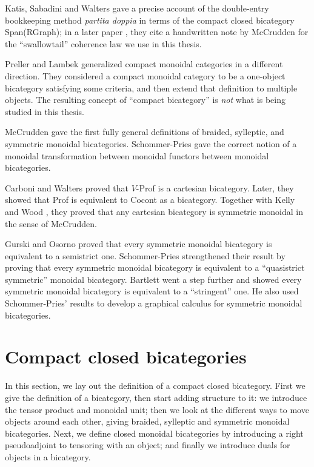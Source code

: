 \documentclass[12pt,twoside,openright]{report}
\begin{document}
Katis, Sabadini and Walters \cite{KSW98} gave a precise account of the double-entry bookkeeping method {\em partita doppia} in terms of the compact closed bicategory Span(RGraph); in a later paper \cite{KW99}, they cite a handwritten note by McCrudden for the ``swallowtail'' coherence law we use in this thesis.

Preller and Lambek \cite{PL07} generalized compact monoidal categories in a different direction.  They considered a compact monoidal category to be a one-object bicategory satisfying some criteria, and then extend that definition to multiple objects.  The resulting concept of ``compact bicategory'' is {\em not} what is being studied in this thesis.

McCrudden \cite{McCrudden} gave the first fully general definitions of braided, sylleptic, and symmetric monoidal bicategories.  Schommer-Pries \cite{SPT} gave the correct notion of a monoidal transformation between monoidal functors between monoidal bicategories.

Carboni and Walters \cite{CW87} proved that $V$-Prof is a cartesian bicategory.  Later, they showed \cite{CW04} that Prof is equivalent to Cocont as a bicategory.  Together with Kelly and Wood \cite{CKWW08}, they proved that any cartesian bicategory is symmetric monoidal in the sense of McCrudden.

Gurski and Osorno \cite{GO} proved that every symmetric monoidal bicategory is equivalent to a semistrict one. Schommer-Pries \cite{SPT} strengthened their result by proving that every symmetric monoidal bicategory is equivalent to a ``quasistrict symmetric'' monoidal bicategory. Bartlett \cite{Bartlett} went a step further and showed every symmetric monoidal bicategory is equivalent to a ``stringent'' one.  He also used Schommer-Pries’ results to develop a graphical calculus for symmetric monoidal bicategories.

\section{Compact closed bicategories}
\label{definition}

In this section, we lay out the definition of a compact closed bicategory.  First we give the definition of a bicategory, then start adding structure to it: we introduce the tensor product and monoidal unit; then we look at the different ways to move objects around each other, giving braided, sylleptic and symmetric monoidal bicategories. Next, we define closed monoidal bicategories by introducing a right pseudoadjoint to tensoring with an object; and finally we introduce duals for objects in a bicategory.
\end{document}
